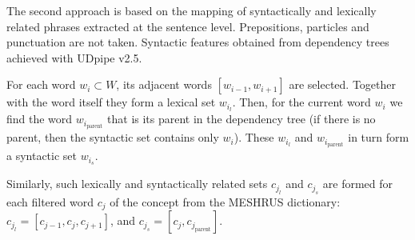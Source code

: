 \documentclass[a4paper,fleqn,longmktitle]{cas-dc}
\begin{document}
The second approach is based on the mapping of syntactically and lexically related phrases extracted at the sentence level. Prepositions, particles and punctuation are not taken. Syntactic features obtained from dependency trees achieved with UDpipe v2.5. 

For each word $w_{i}\subset W$, its adjacent words $[w_{i-1},w_{i+1}]$ are selected. Together with the word itself they form a lexical set $w_{i_l}$. Then, for the current word $w_{i}$ we find the word $w_{i_\text{parent}}$ that is its parent in the dependency tree (if there is no parent, then the syntactic set contains only $w_{i}$). These $w_{i_l}$ and $w_{i_\text{parent}}$ in turn form a syntactic set $w_{i_s}$. 

Similarly, such lexically and syntactically related sets $c_{j_l}$ and $c_{j_s}$ are formed for each filtered word $c_j$ of the concept from the MESHRUS dictionary: $c_{j_l} = [c_{j-1}, c_{j}, c_{j+1}]$, and $c_{j_s} = [c_{j}, c_{j_\text{parent}}]$.

\end{document}
